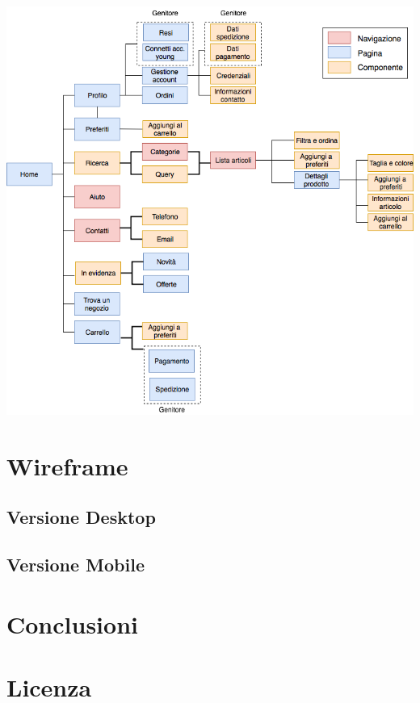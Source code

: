 \documentclass[12pt,a4paper]{report}
\begin{document}
\includegraphics[width=1\textwidth]{"Project Management Sources/Wireframe/Blueprint"}
\chapter{Wireframe}
\section{Versione Desktop}
\section{Versione Mobile}
\chapter{Conclusioni}
\chapter{Licenza}
\end{document}
